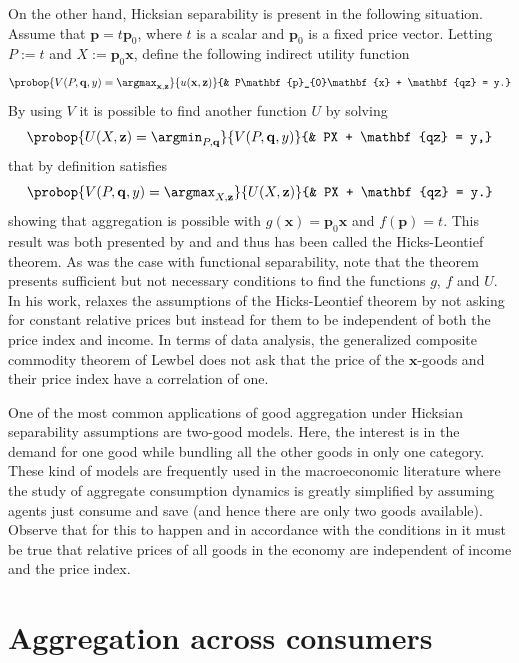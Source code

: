 \documentclass[english, a4paper,12pt]{article}
\begin{document}
On the other hand, Hicksian separability is present in the following situation. Assume that $\mathbf{p} = t\mathbf{p}_{0}$, where $t$ is a scalar and $\mathbf{p}_{0}$ is a fixed price vector. Letting $P := t$ and $X := \mathbf{p}_{0}\mathbf{x}$, define the following indirect utility function
	$$	\probop{V(P, \mathbf{q}, y) = \argmax_{\mathbf{x}, \mathbf{z}}}{u(\mathbf{x}, \mathbf{z})}
				{&	P\mathbf{p}_{0}\mathbf{x} + \mathbf{qz} = y.}
	$$
By using $V$ it is possible to find another function $U$ by solving
	$$	\probop{U(X, \mathbf{z}) = \argmin_{P, \mathbf{q}}}{V(P, \mathbf{q},y)}
				{&	PX + \mathbf{qz} = y,}
	$$
that by definition satisfies
	$$	\probop{V(P, \mathbf{q}, y) = \argmax_{X, \mathbf{z}}}{U(X, \mathbf{z})}
				{&	PX + \mathbf{qz} = y.}
	$$
showing that aggregation is possible with $g(\mathbf{x}) = \mathbf{p}_{0}\mathbf{x}$ and $f(\mathbf{p}) = t$. This result was both presented by \cite{Leontief36} and \cite{HicksBook} and thus has been called the Hicks-Leontief theorem. As was the case with functional separability, note that the theorem presents sufficient but not necessary conditions to find the functions $g$, $f$ and $U$. In his work, \cite{Lewbel96} relaxes the assumptions of the Hicks-Leontief theorem by not asking for constant relative prices but instead for them to be independent of both the price index and income. In terms of data analysis, the generalized composite commodity theorem of Lewbel does not ask that the price of the $\mathbf{x}$-goods and their price index have a correlation of one.

One of the most common applications of good aggregation under Hicksian separability assumptions are two-good models. Here, the interest is in the demand for one good while bundling all the other goods in only one category. These kind of models are frequently used in the macroeconomic literature where the study of aggregate consumption dynamics is greatly simplified by assuming agents just consume and save (and hence there are only two goods available). Observe that for this to happen and in accordance with the conditions in \cite{Lewbel96} it must be true that relative prices of all goods in the economy are independent of income and the price index. 

\section{Aggregation across consumers} \label{sec:RepAg}
\end{document}
